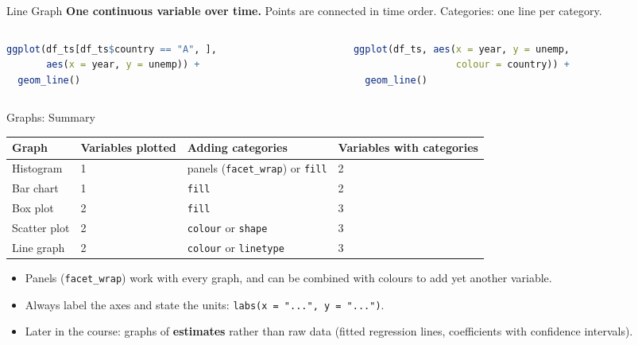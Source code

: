 \documentclass[9pt,aspectratio=169]{beamer}
\begin{document}
\begin{frame}[fragile]{Line Graph}
\linespread{1.3}\selectfont
\textbf{One continuous variable over time.} Points are connected in time order. Categories: one line per category.

\begin{columns}[t]
\begin{column}{0.5\textwidth}
\centering
{}
\begin{lstlisting}[language=R, basicstyle=\ttfamily\scriptsize]
ggplot(df_ts[df_ts$country == "A", ],
       aes(x = year, y = unemp)) +
  geom_line()
\end{lstlisting}
\end{column}
\begin{column}{0.5\textwidth}
\centering
{}
\begin{lstlisting}[language=R, basicstyle=\ttfamily\scriptsize]
ggplot(df_ts, aes(x = year, y = unemp,
                  colour = country)) +
  geom_line()
\end{lstlisting}
\end{column}
\end{columns}
\end{frame}


\begin{frame}{Graphs: Summary}

\begin{center}
\small
\begin{tabular}{llll}
\toprule
\textbf{Graph} & \textbf{Variables plotted} & \textbf{Adding categories} & \textbf{Variables with categories} \\
\midrule
Histogram    & 1 & panels (\texttt{facet\_wrap}) or \texttt{fill} & 2 \\
Bar chart    & 1 & \texttt{fill}                                  & 2 \\
Box plot     & 2 & \texttt{fill}                                  & 3 \\
Scatter plot & 2 & \texttt{colour} or \texttt{shape}              & 3 \\
Line graph   & 2 & \texttt{colour} or \texttt{linetype}           & 3 \\
\bottomrule
\end{tabular}
\end{center}

\pause
\begin{itemize}
  \item Panels (\texttt{facet\_wrap}) work with every graph, and can be combined with colours to add yet another variable.
  \item Always label the axes and state the units: \texttt{labs(x = "...", y = "...")}.
  \item Later in the course: graphs of \textbf{estimates} rather than raw data (fitted regression lines, coefficients with confidence intervals).
\end{itemize}
\end{frame}
\end{document}
